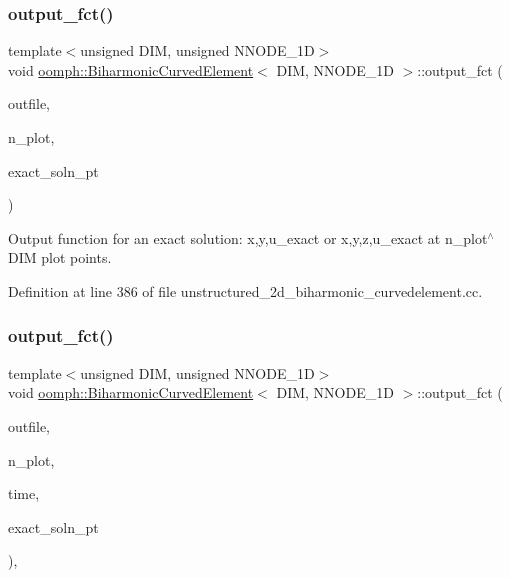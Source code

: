 \subsubsection{\texorpdfstring{output\+\_\+fct()}{output\_fct()}\hspace{0.1cm}{\footnotesize\ttfamily [1/2]}}
{\footnotesize\ttfamily template$<$unsigned D\+IM, unsigned N\+N\+O\+D\+E\+\_\+1D$>$ \\
void \hyperlink{classoomph_1_1BiharmonicCurvedElement}{oomph\+::\+Biharmonic\+Curved\+Element}$<$ D\+IM, N\+N\+O\+D\+E\+\_\+1D $>$\+::output\+\_\+fct (\begin{DoxyParamCaption}\item[{std\+::ostream \&}]{outfile,  }\item[{const unsigned \&}]{n\+\_\+plot,  }\item[{Finite\+Element\+::\+Steady\+Exact\+Solution\+Fct\+Pt}]{exact\+\_\+soln\+\_\+pt }\end{DoxyParamCaption})\hspace{0.3cm}{\ttfamily [inline]}}



Output function for an exact solution\+: x,y,u\+\_\+exact or x,y,z,u\+\_\+exact at n\+\_\+plot$^\wedge$\+D\+IM plot points. 



Definition at line 386 of file unstructured\+\_\+2d\+\_\+biharmonic\+\_\+curvedelement.\+cc.

\mbox{\label{classoomph_1_1BiharmonicCurvedElement_a50187fb5a3a0a5905590ed7cd6780211}} 
\subsubsection{\texorpdfstring{output\+\_\+fct()}{output\_fct()}\hspace{0.1cm}{\footnotesize\ttfamily [2/2]}}
{\footnotesize\ttfamily template$<$unsigned D\+IM, unsigned N\+N\+O\+D\+E\+\_\+1D$>$ \\
void \hyperlink{classoomph_1_1BiharmonicCurvedElement}{oomph\+::\+Biharmonic\+Curved\+Element}$<$ D\+IM, N\+N\+O\+D\+E\+\_\+1D $>$\+::output\+\_\+fct (\begin{DoxyParamCaption}\item[{std\+::ostream \&}]{outfile,  }\item[{const unsigned \&}]{n\+\_\+plot,  }\item[{const double \&}]{time,  }\item[{Finite\+Element\+::\+Unsteady\+Exact\+Solution\+Fct\+Pt}]{exact\+\_\+soln\+\_\+pt }\end{DoxyParamCaption})\hspace{0.3cm}{\ttfamily [inline]}, {\ttfamily [virtual]}}




